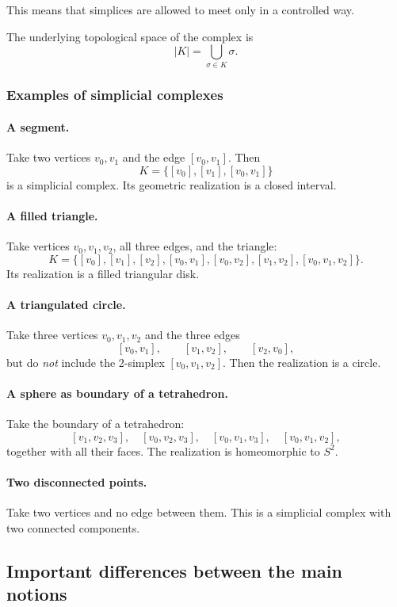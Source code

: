 \documentclass[12pt,a4paper]{article}
\theoremstyle{notespace}
\begin{document}
This means that simplices are allowed to meet only in a controlled way.

The underlying topological space of the complex is
\[
|K|=\bigcup_{\sigma\in K}\sigma.
\]

\subsubsection{Examples of simplicial complexes}

\paragraph{A segment.}
Take two vertices \(v_0,v_1\) and the edge \([v_0,v_1]\). Then
\[
K=\{[v_0],[v_1],[v_0,v_1]\}
\]
is a simplicial complex. Its geometric realization is a closed interval.

\paragraph{A filled triangle.}
Take vertices \(v_0,v_1,v_2\), all three edges, and the triangle:
\[
K=\{[v_0],[v_1],[v_2],[v_0,v_1],[v_0,v_2],[v_1,v_2],[v_0,v_1,v_2]\}.
\]
Its realization is a filled triangular disk.

\paragraph{A triangulated circle.}
Take three vertices \(v_0,v_1,v_2\) and the three edges
\[
[v_0,v_1],\qquad [v_1,v_2],\qquad [v_2,v_0],
\]
but do \emph{not} include the 2-simplex \([v_0,v_1,v_2]\). Then the realization is a circle.

\paragraph{A sphere as boundary of a tetrahedron.}
Take the boundary of a tetrahedron:
\[
[v_1,v_2,v_3],\quad
[v_0,v_2,v_3],\quad
[v_0,v_1,v_3],\quad
[v_0,v_1,v_2],
\]
together with all their faces. The realization is homeomorphic to \(S^2\).

\paragraph{Two disconnected points.}
Take two vertices and no edge between them. This is a simplicial complex with two connected components.

\subsection{Important differences between the main notions}
\end{document}

